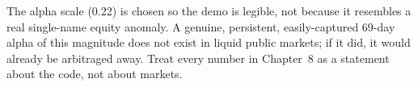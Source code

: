 \begin{caveat}
The alpha scale (0.22) is chosen so the demo is legible, not because it
resembles a real single-name equity anomaly. A genuine, persistent,
easily-captured 69-day alpha of this magnitude does not exist in liquid public
markets; if it did, it would already be arbitraged away. Treat every number in
Chapter~8 as a statement about the code, not about markets.
\end{caveat}
